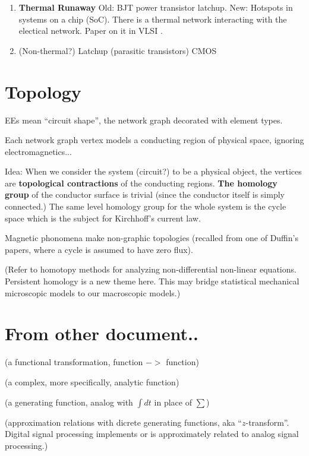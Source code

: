 \documentclass{article}
\begin{document}
\begin{enumerate}
\item
\textbf{Thermal Runaway} Old: BJT power transistor latchup.  New: Hotspots 
in systems on a chip (SoC). There is a thermal network interacting with the 
electical network. Paper on it in VLSI \cite{ThermalVLSI}.

\item (Non-thermal?) Latchup (parasitic transistors) 
CMOS\cite{CMOSLatchUpTINote}

\end{enumerate}

\section{Topology}

EEs mean ``circuit shape'', the network graph decorated with 
element types.

Each network graph vertex models a conducting region of physical space, 
ignoring electromagnetics...

Idea: When we consider the system (circuit?) to be a physical object, the 
vertices are \textbf{topological contractions} of the conducting regions.
\textbf{The homology group} of the conductor surface is trivial (since the
conductor itself is simply connected.)   The same level homology group for 
the whole system is the cycle space which is the subject for Kirchhoff's 
current law.

Magnetic phonomena make non-graphic topologies (recalled from one of 
Duffin's papers, where a cycle is assumed to have zero flux).

(Refer to homotopy methods for analyzing non-differential non-linear 
equations.  Persistent homology is a new theme here.  This may bridge
statistical mechanical microscopic models to our macroscopic models.)

\section{From other document..}


(a functional transformation, function $->$ function)

(a complex, more specifically, analytic function)

(a generating function, analog with $\int dt$ in place of $\sum$)

(approximation relations with dicrete generating functions, 
aka ``$z$-transform''. Digital signal processing implements or
is approximately related to analog signal processing.)
\end{document}
